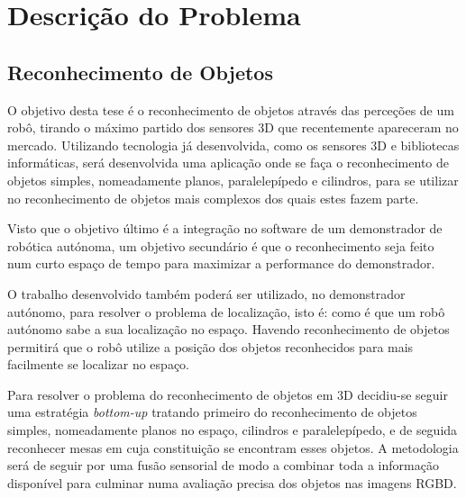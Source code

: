\chapter{Descrição do Problema}\label{chap:chap3}

\section*{}



\section{Reconhecimento de Objetos}


O objetivo desta tese é o reconhecimento de objetos através das perceções de um robô, tirando o máximo partido dos sensores 3D que recentemente apareceram no mercado. Utilizando tecnologia já desenvolvida, como os sensores 3D e bibliotecas informáticas, será desenvolvida uma aplicação onde se faça o reconhecimento de objetos simples, nomeadamente planos, paralelepípedo e cilindros, para se utilizar no reconhecimento de objetos mais complexos dos quais estes fazem parte.

Visto que o objetivo último é a integração no software de um demonstrador de robótica autónoma, um objetivo secundário é que o reconhecimento seja feito num curto espaço de tempo para maximizar a performance do demonstrador.

O trabalho desenvolvido também poderá ser utilizado, no demonstrador autónomo, para resolver o problema de localização, isto é: como é que um robô autónomo sabe a sua localização no espaço. Havendo reconhecimento de objetos permitirá que o robô utilize a posição dos objetos reconhecidos para mais facilmente se localizar no espaço.


Para resolver o problema do reconhecimento de objetos em 3D decidiu-se seguir uma estratégia \emph{bottom-up} tratando primeiro do reconhecimento de objetos simples, nomeadamente planos no espaço, cilindros e paralelepípedo, e de seguida reconhecer mesas em cuja constituição se encontram esses objetos. A metodologia será de seguir por uma fusão sensorial de modo a combinar toda a informação disponível para culminar numa avaliação precisa dos objetos nas imagens RGBD.

